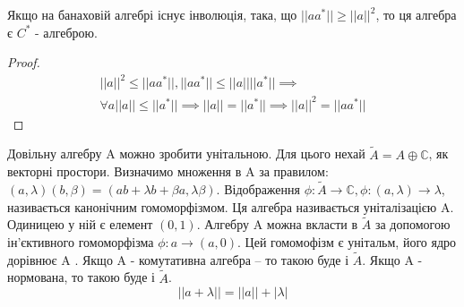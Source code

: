 \begin{lemma}
    Якщо на банаховій алгебрі існує інволюція, така, що $||a a^*|| \geq ||a||^2$, то ця алгебра є $C^*$ - алгеброю.
    \begin{proof}
        \begin{align*}
            ||a||^2 \leq ||a a^*||, ||a a^*|| \leq ||a|| ||a^*|| \implies \\
            \forall a ||a|| \leq ||a^*|| \implies ||a|| = ||a^*|| \implies ||a||^2 = ||a a^*||
        \end{align*}
    \end{proof}
\end{lemma}

Довільну алгебру A можно зробити унітальною.
Для цього нехай $\widetilde{A} = A \oplus \mathbb{C}$, як векторні простори.
Визначимо множення в A за правилом: $(a, \lambda) (b, \beta) = (ab + \lambda b + \beta a, \lambda \beta)$.
Відображення $\phi: \widetilde{A} \rightarrow \mathbb{C}, \phi: (a, \lambda) \rightarrow \lambda$, називається канонічним
гомоморфізмом.
Ця алгебра називається уніталізацією A.
Одиницею у ній є елемент $(0,1)$.
Алгебру A можна вкласти в $\widetilde{A}$ за допомогою \\
ін'єктивного гомоморфізма $\phi: a \rightarrow (a,0)$.
Цей гомомофізм є унітальм, його ядро дорівнює A .
Якщо A - комутативна алгебра -- то такою буде і $\widetilde{A}$.
Якщо A - нормована, то такою буде і $\widetilde{A}$.
\begin{equation*}
    ||a + \lambda|| = ||a|| + |\lambda|
\end{equation*}
